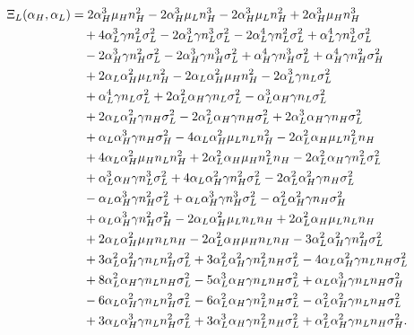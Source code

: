 \documentclass[a4paper,12pt]{article}
\theoremstyle{definition}
\theoremstyle{remark}
\newcommand{\1}{\mathbf{1}}
\begin{document}
\begin{align}
    \Xi_L(\alpha_H,\alpha_L)
    &= 2 \alpha_H^3 \mu_H n_H^2 - 2 \alpha_H^3 \mu_L n_H^3 - 2 \alpha_H^3 \mu_L n_H^2 + 2 \alpha_H^3 \mu_H n_H^3 \notag\\
    &\quad + 4 \alpha_L^3 \gamma n_L^2 \sigma_L^2 - 2 \alpha_L^3 \gamma n_L^3 \sigma_L^2 - 2 \alpha_L^4 \gamma n_L^2 \sigma_L^2 + \alpha_L^4 \gamma n_L^3 \sigma_L^2 \notag\\
    &\quad - 2 \alpha_H^3 \gamma n_H^2 \sigma_L^2 - 2 \alpha_H^3 \gamma n_H^3 \sigma_L^2 + \alpha_H^4 \gamma n_H^3 \sigma_L^2 + \alpha_H^4 \gamma n_H^2 \sigma_H^2 \notag\\
    &\quad + 2 \alpha_L \alpha_H^2 \mu_L n_H^2 - 2 \alpha_L \alpha_H^2 \mu_H n_H^2 - 2 \alpha_L^3 \gamma n_L \sigma_L^2 \notag\\
    &\quad + \alpha_L^4 \gamma n_L \sigma_L^2 + 2 \alpha_L^2 \alpha_H \gamma n_L \sigma_L^2 - \alpha_L^3 \alpha_H \gamma n_L \sigma_L^2 \notag\\
    &\quad + 2 \alpha_L \alpha_H^2 \gamma n_H \sigma_L^2 - 2 \alpha_L^2 \alpha_H \gamma n_H \sigma_L^2 + 2 \alpha_L^3 \alpha_H \gamma n_H \sigma_L^2 \notag\\
    &\quad + \alpha_L \alpha_H^3 \gamma n_H \sigma_H^2 - 4 \alpha_L \alpha_H^2 \mu_L n_L n_H^2 - 2 \alpha_L^2 \alpha_H \mu_L n_L^2 n_H \notag\\
    &\quad + 4 \alpha_L \alpha_H^2 \mu_H n_L n_H^2 + 2 \alpha_L^2 \alpha_H \mu_H n_L^2 n_H - 2 \alpha_L^2 \alpha_H \gamma n_L^2 \sigma_L^2 \notag\\
    &\quad + \alpha_L^3 \alpha_H \gamma n_L^3 \sigma_L^2 + 4 \alpha_L \alpha_H^2 \gamma n_H^2 \sigma_L^2 - 2 \alpha_L^2 \alpha_H^2 \gamma n_H \sigma_L^2 \notag\\
    &\quad - \alpha_L \alpha_H^3 \gamma n_H^2 \sigma_L^2 + \alpha_L \alpha_H^3 \gamma n_H^3 \sigma_L^2 - \alpha_L^2 \alpha_H^2 \gamma n_H \sigma_H^2 \notag\\
    &\quad + \alpha_L \alpha_H^3 \gamma n_H^2 \sigma_H^2 - 2 \alpha_L \alpha_H^2 \mu_L n_L n_H + 2 \alpha_L^2 \alpha_H \mu_L n_L n_H \notag\\
    &\quad + 2 \alpha_L \alpha_H^2 \mu_H n_L n_H - 2 \alpha_L^2 \alpha_H \mu_H n_L n_H - 3 \alpha_L^2 \alpha_H^2 \gamma n_H^2 \sigma_L^2 \notag\\
    &\quad + 3 \alpha_L^2 \alpha_H^2 \gamma n_L n_H^2 \sigma_L^2 + 3 \alpha_L^2 \alpha_H^2 \gamma n_L^2 n_H \sigma_L^2 - 4 \alpha_L \alpha_H^2 \gamma n_L n_H \sigma_L^2 \notag\\
    &\quad + 8 \alpha_L^2 \alpha_H \gamma n_L n_H \sigma_L^2 - 5 \alpha_L^3 \alpha_H \gamma n_L n_H \sigma_L^2 + \alpha_L \alpha_H^3 \gamma n_L n_H \sigma_H^2 \notag\\
    &\quad - 6 \alpha_L \alpha_H^2 \gamma n_L n_H^2 \sigma_L^2 - 6 \alpha_L^2 \alpha_H \gamma n_L^2 n_H \sigma_L^2 - \alpha_L^2 \alpha_H^2 \gamma n_L n_H \sigma_L^2 \notag\\
    &\quad + 3 \alpha_L \alpha_H^3 \gamma n_L n_H^2 \sigma_L^2 + 3 \alpha_L^3 \alpha_H \gamma n_L^2 n_H \sigma_L^2 + \alpha_L^2 \alpha_H^2 \gamma n_L n_H \sigma_H^2. \label{eq:XiL}
\end{align}
\end{document}
